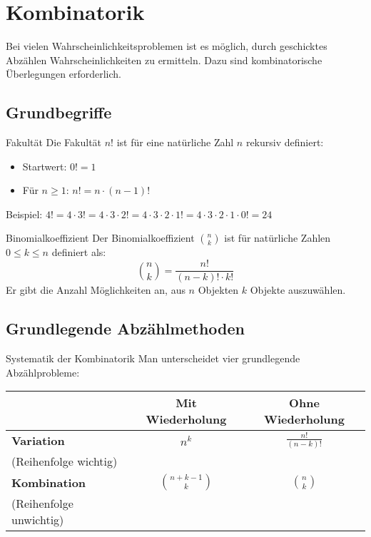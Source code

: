 \section{Kombinatorik}

Bei vielen Wahrscheinlichkeitsproblemen ist es möglich, durch geschicktes Abzählen Wahrscheinlichkeiten zu ermitteln. Dazu sind kombinatorische Überlegungen erforderlich.

\subsection{Grundbegriffe}

\begin{definition}{Fakultät}
Die Fakultät $n!$ ist für eine natürliche Zahl $n$ rekursiv definiert:
\begin{itemize}
    \item Startwert: $0! = 1$
    \item Für $n \geq 1$: $n! = n \cdot (n-1)!$
\end{itemize}
Beispiel: $4! = 4 \cdot 3! = 4 \cdot 3 \cdot 2! = 4 \cdot 3 \cdot 2 \cdot 1! = 4 \cdot 3 \cdot 2 \cdot 1 \cdot 0! = 24$
\end{definition}

\begin{definition}{Binomialkoeffizient}
Der Binomialkoeffizient $\binom{n}{k}$ ist für natürliche Zahlen $0 \leq k \leq n$ definiert als:
$$\binom{n}{k} = \frac{n!}{(n-k)! \cdot k!}$$
Er gibt die Anzahl Möglichkeiten an, aus $n$ Objekten $k$ Objekte auszuwählen.
\end{definition}

\subsection{Grundlegende Abzählmethoden}

\begin{concept}{Systematik der Kombinatorik}
Man unterscheidet vier grundlegende Abzählprobleme:
\begin{center}
\begin{tabular}{|l|c|c|}
\hline 
& \textbf{Mit Wiederholung} & \textbf{Ohne Wiederholung} \\
\hline
\textbf{Variation} & $n^k$ & $\frac{n!}{(n-k)!}$ \\
(Reihenfolge wichtig) & & \\
\hline
\textbf{Kombination} & $\binom{n+k-1}{k}$ & $\binom{n}{k}$ \\
(Reihenfolge unwichtig) & & \\
\hline
\end{tabular}
\end{center}
\end{concept}

